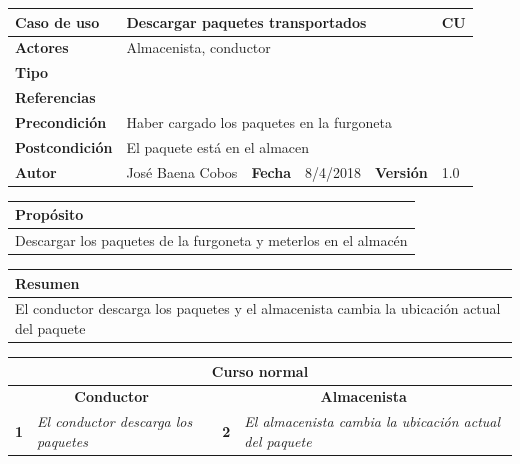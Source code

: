 \documentclass[12pt,spanish]{article}
\begin{document}
\begin{table}[H]
	\centering
	\begin{tabular}{|m{3cm}|m{4cm}|m{2cm}|m{2cm}|m{2cm}|m{1cm}|}
		\hline
		\textbf{Caso de uso} &  \multicolumn{4}{m{11cm}|}{Descargar paquetes transportados} \vline &  \cellcolor{gray!40}CU\arabic{contadorCU}  \stepcounter{contadorCU} \\
		\hline
		\textbf{Actores} & \multicolumn{5}{m{11cm}|}{Almacenista, conductor} \\
		\hline
		\textbf{Tipo} & \multicolumn{5}{m{11cm}|}{} \\
		\hline
		\textbf{Referencias} &\multicolumn{5}{m{11cm}|}{} \\
		\hline
		\textbf{Precondición} & \multicolumn{5}{m{11cm}|}{Haber cargado los paquetes en la furgoneta} \\
		\hline
		\textbf{Postcondición} & \multicolumn{5}{m{11cm}|}{El paquete está en el almacen} \\
		\hline
		\textbf{Autor} & José Baena Cobos & \textbf{Fecha} & 8/4/2018 & \textbf{Versión} & 1.0 \\
		\hline
	\end{tabular}
	
	\vspace{1cm}
	
	\begin{tabular}{|m{16.2cm}|}
		\hline
		\textbf{Propósito} \\
		\hline
		Descargar los paquetes de la furgoneta y meterlos en el almacén\\
		\hline
	\end{tabular}
	
	\vspace{1cm}
	
	\begin{tabular}{|m{16.2cm}|}
		\hline
		\textbf{Resumen} \\
		\hline
		El conductor descarga los paquetes y el almacenista cambia la ubicación actual del paquete\\
		\hline
	\end{tabular}
	
	\vspace{1cm}
	
	\begin{tabular}{|m{5pt}|m{7.33cm}|m{5pt}|m{7.33cm}|}
		\hline
		\multicolumn{4}{|c|}{\textbf{Curso normal}} \\
		\hline
		\multicolumn{2}{|c}{\textbf{Conductor}} & \multicolumn{2}{|c|}{\textbf{Almacenista}} \\
		\hline
		\textbf{1} & \textit{El conductor descarga los paquetes} & \textbf{2} & \textit{El almacenista cambia la ubicación actual del paquete} \\
		\hline
	

\end{tabular}
\end{table}
\end{document}
